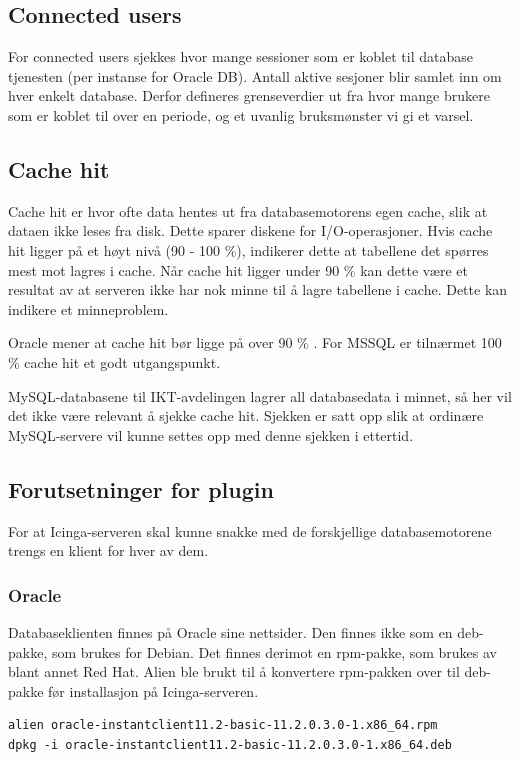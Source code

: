 \subsection*{Connected users}
For connected users sjekkes hvor mange sessioner som er koblet til database tjenesten (per instanse for Oracle DB). Antall aktive sesjoner blir samlet inn om hver enkelt database. Derfor defineres grenseverdier ut fra hvor mange brukere som er koblet til over en periode, og et uvanlig bruksmønster vi gi et varsel.

\subsection*{Cache hit}
Cache hit er hvor ofte data hentes ut fra databasemotorens egen cache, slik at dataen ikke leses fra disk. Dette sparer diskene for I/O-operasjoner. Hvis cache hit ligger på et høyt nivå (90 - 100 \%), indikerer dette at tabellene det spørres mest mot lagres i cache. Når cache hit ligger under 90 \% kan dette være et resultat av at serveren ikke har nok minne til å lagre tabellene i cache. Dette kan indikere et minneproblem.

Oracle mener at cache hit bør ligge på over 90 \% \cite{oraclecachehit}. For MSSQL er tilnærmet 100 \% cache hit et godt utgangspunkt\cite{sqlmonitoring}.

MySQL-databasene til IKT-avdelingen lagrer all databasedata i minnet, så her vil det ikke være relevant å sjekke cache hit. Sjekken er satt opp slik at ordinære MySQL-servere vil kunne settes opp med denne sjekken i ettertid.

\subsection{Forutsetninger for plugin}
For at Icinga-serveren skal kunne snakke med de forskjellige databasemotorene trengs en klient for hver av dem. 

\subsubsection{Oracle}\label{sec:oracle}
Databaseklienten finnes på Oracle sine nettsider\cite{oracleclient}. Den finnes ikke som en deb-pakke, som brukes for Debian. Det finnes derimot en rpm-pakke, som brukes av blant annet Red Hat. Alien ble brukt til å konvertere rpm-pakken over til deb-pakke før installasjon på Icinga-serveren\cite{debian:alien}.

\begin{lstlisting}[style=example]
alien oracle-instantclient11.2-basic-11.2.0.3.0-1.x86_64.rpm 
dpkg -i oracle-instantclient11.2-basic-11.2.0.3.0-1.x86_64.deb
\end{lstlisting}


